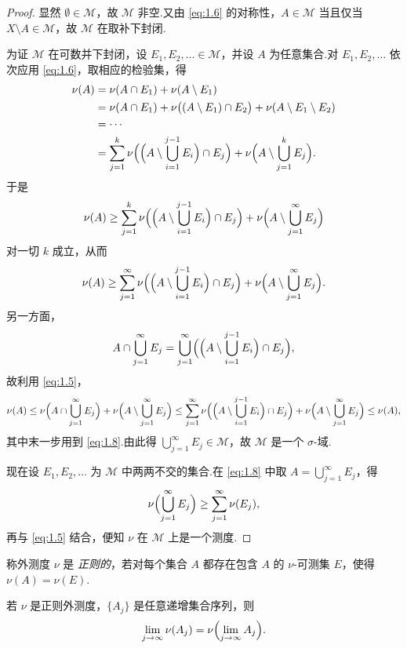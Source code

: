 \begin{proof}
显然 $\emptyset\in\mathcal{M}$，故 $\mathcal{M}$ 非空.又由 \eqref{eq:1.6} 的对称性，$A\in\mathcal{M}$ 当且仅当 $X\setminus A\in\mathcal{M}$，故 $\mathcal{M}$ 在取补下封闭.

为证 $\mathcal{M}$ 在可数并下封闭，设 $E_1,E_2,\ldots\in\mathcal{M}$，并设 $A$ 为任意集合.对 $E_1,E_2,\ldots$ 依次应用 \eqref{eq:1.6}，取相应的检验集，得
\[
\begin{aligned}
  \nu(A)
    &=\nu(A\cap E_1)+\nu(A\setminus E_1)\\
    &=\nu(A\cap E_1)+\nu\bigl((A\setminus E_1)\cap E_2\bigr)+\nu(A\setminus E_1\setminus E_2)\\
    &=\cdots\\
    &=\sum_{j=1}^{k}\nu\Bigl(\Bigl(A\setminus\bigcup_{i=1}^{j-1}E_i\Bigr)\cap E_j\Bigr)
      +\nu\Bigl(A\setminus\bigcup_{j=1}^{k}E_j\Bigr).
\end{aligned}
\]
于是
\[
  \nu(A)\geq\sum_{j=1}^{k}\nu\Bigl(\Bigl(A\setminus\bigcup_{i=1}^{j-1}E_i\Bigr)\cap E_j\Bigr)
  +\nu\Bigl(A\setminus\bigcup_{j=1}^{\infty}E_j\Bigr)
\]
对一切 $k$ 成立，从而
\begin{equation}\label{eq:1.8}
  \nu(A)\geq\sum_{j=1}^{\infty}\nu\Bigl(\Bigl(A\setminus\bigcup_{i=1}^{j-1}E_i\Bigr)\cap E_j\Bigr)
  +\nu\Bigl(A\setminus\bigcup_{j=1}^{\infty}E_j\Bigr).
\end{equation}
另一方面，
\[
  A\cap\bigcup_{j=1}^{\infty}E_j=\bigcup_{j=1}^{\infty}\Bigl(\Bigl(A\setminus\bigcup_{i=1}^{j-1}E_i\Bigr)\cap E_j\Bigr),
\]
故利用 \eqref{eq:1.5}，
\[
  \nu(A)\leq\nu\Bigl(A\cap\bigcup_{j=1}^{\infty}E_j\Bigr)+\nu\Bigl(A\setminus\bigcup_{j=1}^{\infty}E_j\Bigr)
  \leq\sum_{j=1}^{\infty}\nu\Bigl(\Bigl(A\setminus\bigcup_{i=1}^{j-1}E_i\Bigr)\cap E_j\Bigr)
  +\nu\Bigl(A\setminus\bigcup_{j=1}^{\infty}E_j\Bigr)\leq\nu(A),
\]
其中末一步用到 \eqref{eq:1.8}.由此得 $\bigcup_{j=1}^{\infty}E_j\in\mathcal{M}$，故 $\mathcal{M}$ 是一个 $\sigma$-域.

现在设 $E_1,E_2,\ldots$ 为 $\mathcal{M}$ 中两两不交的集合.在 \eqref{eq:1.8} 中取 $A=\bigcup_{j=1}^{\infty}E_j$，得
\[
  \nu\Bigl(\bigcup_{j=1}^{\infty}E_j\Bigr)\geq\sum_{j=1}^{\infty}\nu(E_j),
\]
再与 \eqref{eq:1.5} 结合，便知 $\nu$ 在 $\mathcal{M}$ 上是一个测度.
\end{proof}

称外测度 $\nu$ 是 \emph{正则的}，若对每个集合 $A$ 都存在包含 $A$ 的 $\nu$-可测集 $E$，使得 $\nu(A)=\nu(E)$.

\begin{lemma}\label{lem:1.3}
若 $\nu$ 是正则外测度，$\{A_j\}$ 是任意递增集合序列，则
\[
  \lim_{j\to\infty}\nu(A_j)=\nu\Bigl(\lim_{j\to\infty}A_j\Bigr).
\]
\end{lemma}

